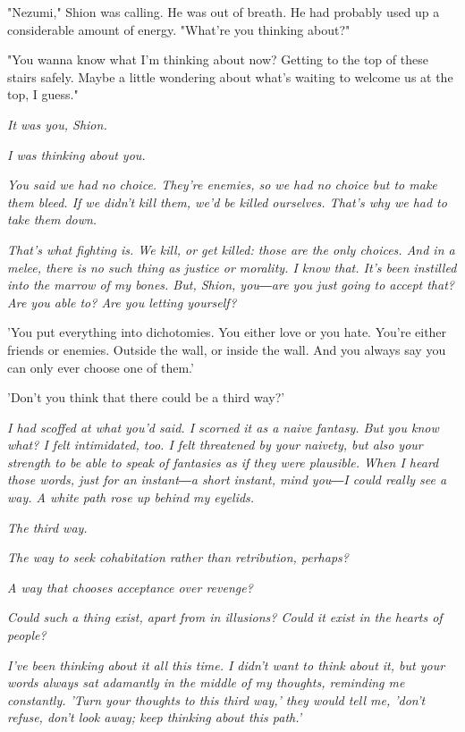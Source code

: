 "Nezumi," Shion was calling. He was out of breath. He had probably used
up a considerable amount of energy. "What're you thinking about?"

"You wanna know what I'm thinking about now? Getting to the top of these
stairs safely. Maybe a little wondering about what's waiting to welcome
us at the top, I guess."

\emph{It was you, Shion.}

\emph{I was thinking about you.}

\emph{You said we had no choice. They're enemies, so we had no choice but to
	make them bleed. If we didn't kill them, we'd be killed ourselves.
	That's why we had to take them down.}

\emph{That's what fighting is. We kill, or get killed: those are the only
	choices. And in a melee, there is no such thing as justice or morality.
	I know that. It's been instilled into the marrow of my bones. But,
	Shion, you―are you just going to accept that? Are you able to? Are you
	letting yourself?}

'You put everything into dichotomies. You either love or you hate.
You're either friends or enemies. Outside the wall, or inside the wall.
And you always say you can only ever choose one of them.'

'Don't you think that there could be a third way?'

\emph{I had scoffed at what you'd said. I scorned it as a naive fantasy. But
	you know what? I felt intimidated, too. I felt threatened by your
	naivety, but also your strength to be able to speak of fantasies as if
	they were plausible. When I heard those words, just for an instant―a
	short instant, mind you―I could really see a way. A white path rose up
	behind my eyelids.}

\emph{The third way.}

\emph{The way to seek cohabitation rather than retribution, perhaps?}

\emph{A way that chooses acceptance over revenge?}

\emph{Could such a thing exist, apart from in illusions? Could it exist in the
	hearts of people?}

\emph{I've been thinking about it all this time. I didn't want to think about
	it, but your words always sat adamantly in the middle of my thoughts,
	reminding me constantly. 'Turn your thoughts to this third way,' they
	would tell me, 'don't refuse, don't look away; keep thinking about this
	path.'}

